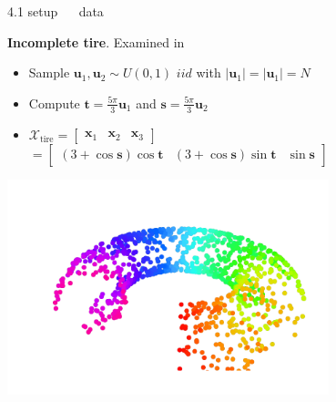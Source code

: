\documentclass[11pt, compress, t, notes = noshow, xcolor = table, 
aspectratio = 1610]{beamer}
\newcommand{\highlight}[1]{\textcolor{highlightcol}{\textbf{#1}}}
\newcommand{\flexitem}[1]{\item[$\highlight{#1}$]}
\newcommand{\X}{\mathcal{X}}
\newcommand{\x}{\bm{x}}
\begin{document}
\begin{frame}{\textcolor{gray!90}{4.1 setup} ~~ data}
\begin{minipage}[b]{0.65\textwidth}
  \textbf{Incomplete tire}. Examined in \citet{yangetal2006}
  \begin{itemize}
    \flexitem{1} Sample $\bm{u}_1, \bm{u}_2 \sim U(0, 1)$ 
    $\mathit{ iid}$ with $\rvert \bm{u}_1 \rvert = \rvert \bm{u}_1 \rvert = N$
    \flexitem{2} Compute $\bm{t} = \frac{5 \pi}{3} \bm{u}_1$ and 
    $\bm{s} = \frac{5 \pi}{3} \bm{u}_2$
    \flexitem{3} 
    $\X_{\text{tire}} =
    \begin{bmatrix} \x_1 & \x_2 & \x_3 \end{bmatrix} $ \\
    \phantom{$\X_{\text{tire}}$} $ = \begin{bmatrix} (3 + \cos{\bm{s}}) 
    \cos{\bm{t}} & (3 + \cos{\bm{s}}) \sin{\bm{t}} & \sin{\bm{s}} \end{bmatrix}$
  \end{itemize}
\end{minipage}%
\begin{minipage}[b]{0.35\textwidth}
  \centering
  \includegraphics[trim = 20 0 0 0, clip, %
    width = 0.7\textwidth]{figures/incomplete-tire}
\end{minipage}

\end{frame}

\end{document}
